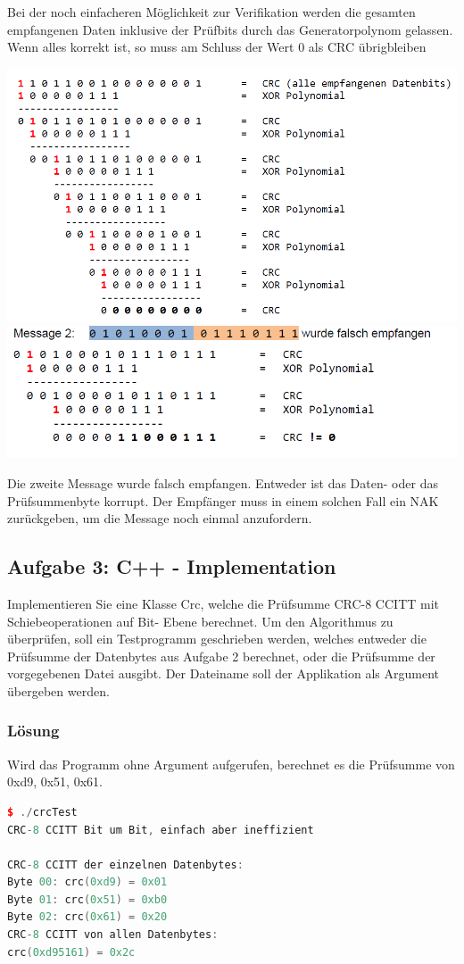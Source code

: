 Bei der noch einfacheren Möglichkeit zur Verifikation werden die gesamten empfangenen Daten inklusive der Prüfbits durch das Generatorpolynom gelassen. Wenn alles korrekt ist, so muss am Schluss der Wert 0 als CRC übrigbleiben

\begin{center}
  \includegraphics[width=.6\linewidth]{900-Praktika/prak06/crc3.PNG}
  \includegraphics[width=.6\linewidth]{900-Praktika/prak06/crc4.PNG}
\end{center}

Die zweite Message wurde falsch empfangen. Entweder ist das Daten- oder das Prüfsummenbyte korrupt. Der Empfänger muss in einem solchen Fall ein NAK zurückgeben, um die Message noch einmal anzufordern.

\subsection{Aufgabe 3: C++ - Implementation}
Implementieren Sie eine Klasse Crc, welche die Prüfsumme CRC-8 CCITT mit Schiebeoperationen auf Bit-
Ebene berechnet. Um den Algorithmus zu überprüfen, soll ein Testprogramm geschrieben werden, welches
entweder die Prüfsumme der Datenbytes aus Aufgabe 2 berechnet, oder die Prüfsumme der vorgegebenen
Datei ausgibt. Der Dateiname soll der Applikation als Argument übergeben werden.

\subsubsection{Lösung}

Wird das Programm ohne Argument aufgerufen, berechnet es die Prüfsumme von {0xd9, 0x51, 0x61}.

\begin{lstlisting}[language=C++, style=C++]
$ ./crcTest
CRC-8 CCITT Bit um Bit, einfach aber ineffizient

CRC-8 CCITT der einzelnen Datenbytes:
Byte 00: crc(0xd9) = 0x01
Byte 01: crc(0x51) = 0xb0
Byte 02: crc(0x61) = 0x20
CRC-8 CCITT von allen Datenbytes:
crc(0xd95161) = 0x2c
\end{lstlisting}

